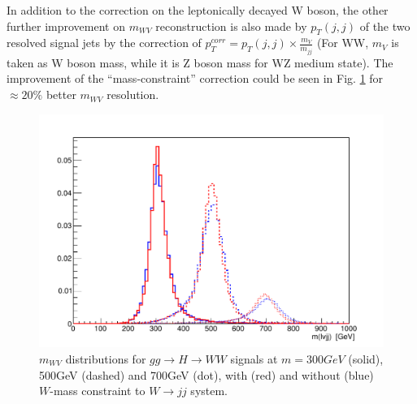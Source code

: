 \noindent
In addition to the correction on the leptonically decayed W boson, the other further improvement on $m_{WV}$ reconstruction is also made by $p_{T}(j,j)$ of the two resolved signal jets by the correction of $p_{T}^{corr}=p_{T}(j,j)\times \frac{m_{V}}{m_{jj}}$ (For WW, $m_V$ is taken as W boson mass, while it is Z boson mass for WZ medium state). The improvement of the ``mass-constraint'' correction could be seen in Fig. \ref{Fig:WHadmassConst} for $\approx 20\%$ better $m_{WV}$ resolution. 
\begin{figure}[h]
	\centering
	\includegraphics[width=0.6\hsize]{Chapter3/lvjjmass_WmassConstraint}
	\caption{$m_{WV}$ distributions for $gg \rightarrow H \rightarrow WW$ signals at $m=300GeV$ (solid), 500GeV (dashed) and 700GeV (dot), with (red) and without (blue) $W$-mass constraint to $W \rightarrow jj$ system.}\label{Fig:WHadmassConst}
\end{figure}
\noindent
